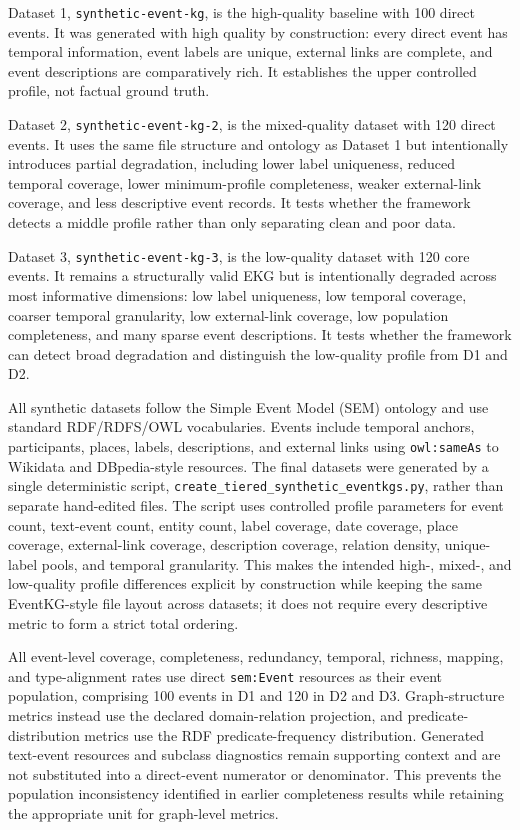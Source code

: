 Dataset 1, \texttt{synthetic-event-kg}, is the high-quality baseline with 100 direct events. It was generated with high quality by construction: every direct event has temporal information, event labels are unique, external links are complete, and event descriptions are comparatively rich. It establishes the upper controlled profile, not factual ground truth.

Dataset 2, \texttt{synthetic-event-kg-2}, is the mixed-quality dataset with 120 direct events. It uses the same file structure and ontology as Dataset 1 but intentionally introduces partial degradation, including lower label uniqueness, reduced temporal coverage, lower minimum-profile completeness, weaker external-link coverage, and less descriptive event records. It tests whether the framework detects a middle profile rather than only separating clean and poor data.

Dataset 3, \texttt{synthetic-event-kg-3}, is the low-quality dataset with 120 core events. It remains a structurally valid EKG but is intentionally degraded across most informative dimensions: low label uniqueness, low temporal coverage, coarser temporal granularity, low external-link coverage, low population completeness, and many sparse event descriptions. It tests whether the framework can detect broad degradation and distinguish the low-quality profile from D1 and D2.

All synthetic datasets follow the Simple Event Model (SEM) ontology and use standard RDF/RDFS/OWL vocabularies. Events include temporal anchors, participants, places, labels, descriptions, and external links using \texttt{owl:sameAs} to Wikidata and DBpedia-style resources. The final datasets were generated by a single deterministic script, \texttt{create\_tiered\_synthetic\_eventkgs.py}, rather than separate hand-edited files. The script uses controlled profile parameters for event count, text-event count, entity count, label coverage, date coverage, place coverage, external-link coverage, description coverage, relation density, unique-label pools, and temporal granularity. This makes the intended high-, mixed-, and low-quality profile differences explicit by construction while keeping the same EventKG-style file layout across datasets; it does not require every descriptive metric to form a strict total ordering.

All event-level coverage, completeness, redundancy, temporal, richness, mapping, and type-alignment rates use direct \texttt{sem:Event} resources as their event population, comprising 100 events in D1 and 120 in D2 and D3. Graph-structure metrics instead use the declared domain-relation projection, and predicate-distribution metrics use the RDF predicate-frequency distribution. Generated text-event resources and subclass diagnostics remain supporting context and are not substituted into a direct-event numerator or denominator. This prevents the population inconsistency identified in earlier completeness results while retaining the appropriate unit for graph-level metrics.


